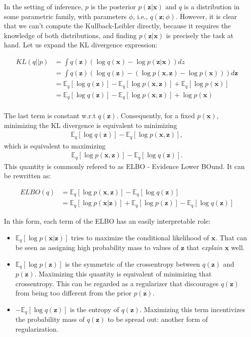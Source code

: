 In the setting of inference, $p$ is the posterior $p(\bm{z}|\bm{x})$ and $q$ is a distribution
in some parametric family, with parameters $\phi$, i.e., $q(\bm{z}; \phi)$. However,
it is clear that we can't compute the Kullback-Leibler directly, because it
requires the knowledge of both distributions, and finding $p(\bm{z}|\bm{x})$ is
precisely the task at hand. Let us expand the KL divergence expression:

\begin{align}
    KL(q||p) &= \int q(\bm{z}) (\log q(\bm{x}) - \log p(\bm{z}|\bm{x})) dz \\
             &= \int q(\bm{z}) (\log q(\bm{z}) - (\log p(\bm{x}, \bm{z}) - \log p(\bm{x}))) d\bm{z} \\
             &= \mathbb{E}_q [\log q(\bm{z})] - \mathbb{E}_q [\log p(\bm{x}, \bm{z})] + \mathbb{E}_q [\log p(\bm{x})] \\
             &= \mathbb{E}_q [\log q(\bm{z})] - \mathbb{E}_q [\log p(\bm{x}, \bm{z})] + \log p(\bm{x}) \\
\end{align}

The last term is constant w.r.t $q(\bm{z})$. Consequently, for a fixed $p(\bm{x})$,
minimizing the KL divergence is equivalent to minimizing
\begin{align}
    \mathbb{E}_q [\log q(\bm{z})] - \mathbb{E}_q [\log p(\bm{x}, \bm{z})],
\end{align} which is equivalent to maximizing
\begin{align}
    \mathbb{E}_q [\log p(\bm{x}, \bm{z})] - \mathbb{E}_q [\log q(\bm{z})]. \label{eq:elbokldiv}
\end{align} This quantity is commonly refered to as ELBO - Evidence Lower BOund.
It can be rewritten as:

\begin{align}
    ELBO(q) &= \mathbb{E}_q [\log p(\bm{x}, \bm{z})] - \mathbb{E}_q [\log q(\bm{z})] \\
            &= \mathbb{E}_q [\log p(\bm{x}|\bm{z})] + \mathbb{E}_q [\log p(\bm{z})] - \mathbb{E}_q [\log q(\bm{z})]
\end{align}

In this form, each term of the ELBO has an easily interpretable role:
\begin{itemize}
    \item $\mathbb{E}_q [\log p(\bm{x}|\bm{z})]$ tries to maximize the conditional likelihood of $\bm{x}$. That
        can be seen as assigning high probability mass to values of $\bm{z}$ that \emph{explain} $\bm{x}$
        well.
    \item $\mathbb{E}_q [\log p(\bm{z})]$ is the symmetric of the crossentropy between
        $q(\bm{z})$ and $p(\bm{z})$. Maximizing this quantity is equivalent of minimizing
        that crossentropy. This can be regarded as a regularizer that discourages
        $q(\bm{z})$ from being too different from the prior $p(\bm{z})$.
    \item $ - \mathbb{E}_q [\log q(\bm{z})]$ is the entropy of $q(\bm{z})$. Maximizing
        this term incentivizes the probability mass of $q(\bm{z})$ to be spread out:
        another form of regularization.
\end{itemize}


